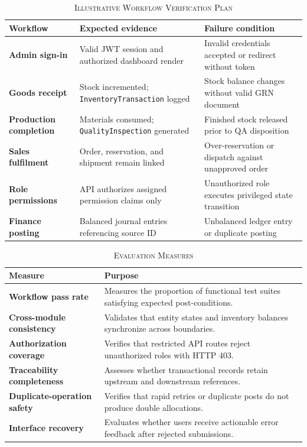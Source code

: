 \documentclass[conference]{IEEEtran}
\begin{document}
\begin{table}[t]
\caption{\textsc{Illustrative Workflow Verification Plan}}
\label{tab:verification_plan}
\centering
\begin{tabularx}{\columnwidth}{>{\raggedright\arraybackslash\bfseries}p{1.7cm}XX}
\toprule
Workflow & Expected evidence & Failure condition \\
\midrule
Admin sign-in & Valid JWT session and authorized dashboard render & Invalid credentials accepted or redirect without token \\
\addlinespace[2pt]
Goods receipt & Stock incremented; \texttt{InventoryTransaction} logged & Stock balance changes without valid GRN document \\
\addlinespace[2pt]
Production completion & Materials consumed; \texttt{QualityInspection} generated & Finished stock released prior to QA disposition \\
\addlinespace[2pt]
Sales fulfilment & Order, reservation, and shipment remain linked & Over-reservation or dispatch against unapproved order \\
\addlinespace[2pt]
Role permissions & API authorizes assigned permission claims only & Unauthorized role executes privileged state transition \\
\addlinespace[2pt]
Finance posting & Balanced journal entries referencing source ID & Unbalanced ledger entry or duplicate posting \\
\bottomrule
\end{tabularx}
\end{table}

\begin{table}[t]
\caption{\textsc{Evaluation Measures}}
\label{tab:evaluation_measures}
\centering
\begin{tabularx}{\columnwidth}{>{\raggedright\arraybackslash\bfseries}p{2.3cm}X}
\toprule
Measure & Purpose \\
\midrule
Workflow pass rate & Measures the proportion of functional test suites satisfying expected post-conditions. \\
\addlinespace[2pt]
Cross-module consistency & Validates that entity states and inventory balances synchronize across boundaries. \\
\addlinespace[2pt]
Authorization coverage & Verifies that restricted API routes reject unauthorized roles with HTTP 403. \\
\addlinespace[2pt]
Traceability completeness & Assesses whether transactional records retain upstream and downstream references. \\
\addlinespace[2pt]
Duplicate-operation safety & Verifies that rapid retries or duplicate posts do not produce double allocations. \\
\addlinespace[2pt]
Interface recovery & Evaluates whether users receive actionable error feedback after rejected submissions. \\
\bottomrule
\end{tabularx}
\end{table}
\end{document}
